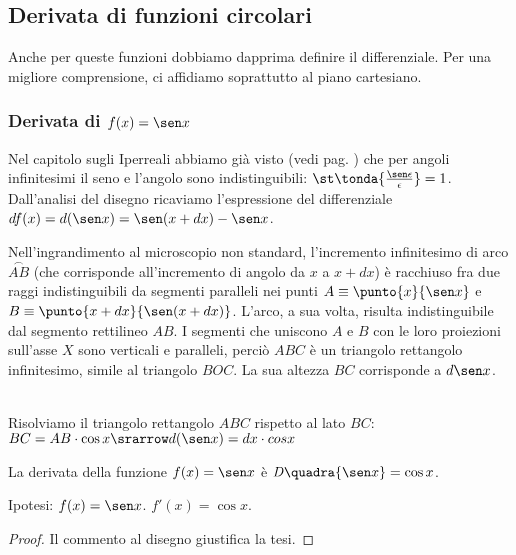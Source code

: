 \subsection{Derivata di funzioni circolari}
\label{}
Anche per queste funzioni dobbiamo dapprima definire il differenziale. 
Per una migliore comprensione, ci affidiamo soprattutto al piano cartesiano.
\subsubsection{Derivata di $f(x)=\sen x$}
Nel capitolo sugli Iperreali abbiamo già visto 
(vedi pag. \pageref{subsubsec:insnum_fseno}) che per angoli infinitesimi il 
seno e 
l'angolo sono indistinguibili: $\st\tonda{\frac{\sen 
\epsilon}{\epsilon}}=1$.
Dall'analisi del disegno ricaviamo l'espressione del differenziale
$df(x)=d(\sen x)= \sen (x+dx) -\sen x$.

\begin{inaccessibleblock}
  \begin{minipage}[]{.40\textwidth}
   \dseno 
 \end{minipage} 
  \hfill
 \begin{minipage}[]{.56\textwidth}
Nell'ingrandimento al microscopio non standard, l'incremento infinitesimo di
arco $\overset{\frown}{AB}$ (che corrisponde all'incremento di angolo da $x$
a $x+dx$) è racchiuso fra due raggi indistinguibili da segmenti paralleli 
nei punti $A\equiv \punto{x}{\sen x}$ e $B\equiv \punto{x+dx}{\sen(x+dx)}$. 
L'arco, a sua volta, risulta indistinguibile dal segmento rettilineo $AB$.
I segmenti che uniscono $A$ e $B$ con le loro proiezioni sull'asse $X$ sono
verticali e paralleli, perciò $ABC$ è un triangolo rettangolo infinitesimo, 
simile al triangolo $BOC$. La sua altezza $BC$ corrisponde a $d\sen x$. 
 \end{minipage}
\end{inaccessibleblock}
\label{fig_diff01dseno}\\

Risolviamo il triangolo rettangolo $ABC$ rispetto al lato $BC$:\\
$BC=AB\cdot \cos x \srarrow d(\sen x)= dx\cdot cos x$  

\begin{teorema}
  La derivata della funzione $f(x)=\sen x$ è $\mathit{D}\quadra{\sen 
x}=\cos x$.
\end{teorema}
\noindent Ipotesi: $f(x)=\sen x$. \tab $f'(x)=\cos x$.
\begin{proof}
 Il commento al disegno giustifica la tesi. 
\end{proof}


